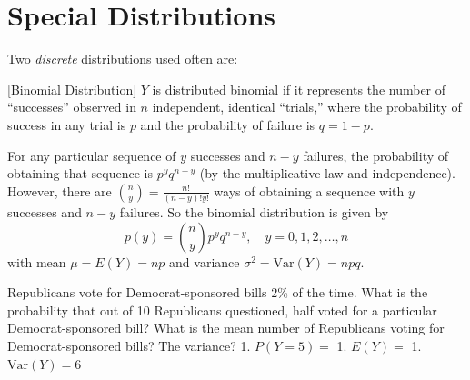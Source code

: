 \documentclass[]{book}
\theoremstyle{definition}
\theoremstyle{definition}
\theoremstyle{definition}
\theoremstyle{remark}
\begin{document}
\hypertarget{special-distributions}{%
\section{Special Distributions}\label{special-distributions}}

Two \emph{discrete} distributions used often are:

[Binomial Distribution]
\protect\hypertarget{def:unnamed-chunk-87}{}{\label{def:unnamed-chunk-87} {} }\(Y\) is distributed binomial if it represents the number of ``successes'' observed in \(n\) independent, identical ``trials,'' where the probability of success in any trial is \(p\) and the probability of failure is \(q=1-p\).

For any particular sequence of \(y\) successes and \(n-y\) failures, the probability of obtaining that sequence is \(p^y q^{n-y}\) (by the multiplicative law and independence). However, there are \(\binom{n}{y}=\frac{n!}{(n-y)!y!}\) ways of obtaining a sequence with \(y\) successes and \(n-y\) failures. So the binomial distribution is given by \[p(y)=\binom{n}{y}p^y q^{n-y}, \quad y=0,1,2,\ldots,n\] with mean \(\mu=E(Y)=np\) and variance \(\sigma^2=\text{Var}(Y)=npq\).

\protect\hypertarget{exm:unnamed-chunk-88}{}{\label{exm:unnamed-chunk-88} }Republicans vote for Democrat-sponsored bills 2\% of the time. What is the probability that out of 10 Republicans questioned, half voted for a particular Democrat-sponsored bill? What is the mean number of Republicans voting for Democrat-sponsored bills? The variance?
1. \(P(Y=5)=\)
1. \(E(Y)=\)
1. \(\text{Var}(Y)=6\)

\end{document}
